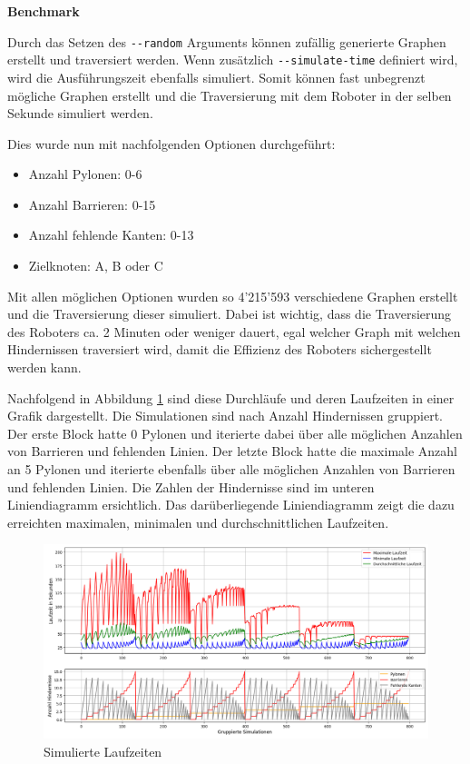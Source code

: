 \textbf{Benchmark}

Durch das Setzen des \verb|--random| Arguments können zufällig generierte Graphen erstellt und traversiert werden.
Wenn zusätzlich \verb|--simulate-time| definiert wird, wird die Ausführungszeit ebenfalls simuliert.
Somit können fast unbegrenzt mögliche Graphen erstellt und die Traversierung mit dem Roboter in der selben Sekunde simuliert werden.

Dies wurde nun mit nachfolgenden Optionen durchgeführt:

\begin{itemize}
  \item Anzahl Pylonen: 0-6
  \item Anzahl Barrieren: 0-15
  \item Anzahl fehlende Kanten: 0-13
  \item Zielknoten: A, B oder C
\end{itemize}

Mit allen möglichen Optionen wurden so 4'215'593 verschiedene Graphen erstellt und die Traversierung dieser simuliert.
Dabei ist wichtig, dass die Traversierung des Roboters ca. 2 Minuten oder weniger dauert, egal welcher Graph mit welchen Hindernissen traversiert wird, damit die Effizienz des Roboters sichergestellt werden kann.

Nachfolgend in Abbildung \ref{fig:simulation-run-chart} sind diese Durchläufe und deren Laufzeiten in einer Grafik dargestellt. Die Simulationen sind nach Anzahl Hindernissen gruppiert. Der erste Block hatte 0 Pylonen und iterierte dabei über alle möglichen Anzahlen von Barrieren und fehlenden Linien. Der letzte Block hatte die maximale Anzahl an 5 Pylonen und iterierte ebenfalls über alle möglichen Anzahlen von Barrieren und fehlenden Linien.
Die Zahlen der Hindernisse sind im unteren Liniendiagramm ersichtlich. Das darüberliegende Liniendiagramm zeigt die dazu erreichten maximalen, minimalen und durchschnittlichen Laufzeiten.

\begin{figure}[H]
  \centering\includegraphics[width=\linewidth]{assets/informatik-prototyp/simulator/simulations_chart_sm.png}
  \caption{Simulierte Laufzeiten}
  \label{fig:simulation-run-chart}
\end{figure}

